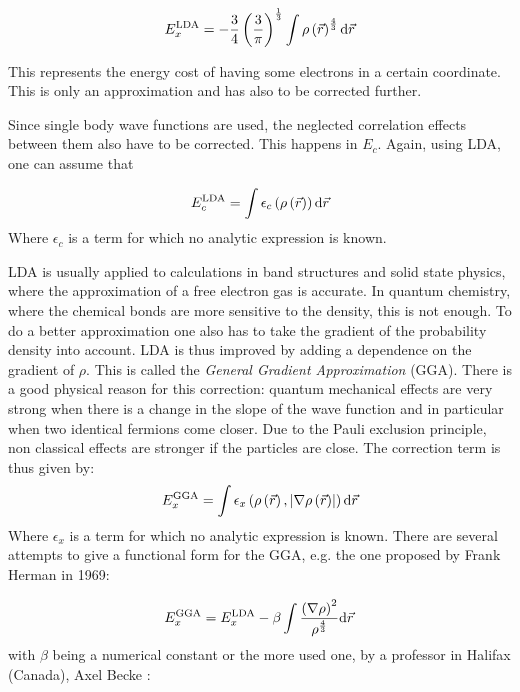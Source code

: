 \begin{equation}
E_x^{\text{LDA}} = 
-\frac{3}{4} \left(\frac{3}{\pi}\right)^{\frac{1}{3}} \int {\rho\ensuremath{\left(\vec{r}\right)}^{\frac{4}{3}} \text{d}\vec{r}  }
\end{equation}

\noindent
This represents the energy cost of having some electrons in a certain coordinate. This is only an approximation and has also to be corrected further.

Since single body wave functions are used, the neglected correlation effects between them also have to be corrected. This happens in $E_c$. Again, using LDA, one can assume that

\begin{equation}
E_c^{\text{LDA}} = 
 \int {\epsilon_c \ensuremath{\left(\rho\left(\vec{r}\right)\right)} \text{d}\vec{r}  }
\end{equation}
Where $\epsilon_c$ is a term for which no analytic expression is known.


LDA is usually applied to calculations in band structures and solid state physics, where the approximation of a free electron gas is accurate. In quantum chemistry, where the chemical bonds are more sensitive to the density, this is not enough. To do a better approximation one also has to take  the gradient of the probability density into account. LDA is thus improved by adding a dependence on the gradient of $\rho$. This is called the \emph{General Gradient Approximation} (GGA).  There is a good physical reason for this correction: quantum mechanical effects are very strong when there is a change in the slope of the wave function and in particular when two identical fermions come closer. Due to the Pauli exclusion principle, non classical effects are stronger if the particles are close. The correction term is thus given by:
\begin{equation}
E_x^{\text{GGA}} = 
 \int {\epsilon_x \ensuremath{\left(   \rho\left(\vec{r}\right), \left|\nabla  \rho\left(\vec{r}\right) \right|   \right)} \text{d}\vec{r}  }
\end{equation}
Where $\epsilon_x$ is a term for which no analytic expression is known. There are several attempts to give a functional form for the GGA, e.g. the one proposed by Frank Herman in 1969:

\begin{equation}
E_x^{\text{GGA}} =  E_x^{\text{LDA}} -
 \beta \int { \frac{\ensuremath{\left(\nabla \rho\right)}^2}{\rho^{\frac{4}{3}}}  \text{d}\vec{r}  }
\end{equation}
with $\beta$ being a numerical constant or the more used one, by a professor in Halifax (Canada), Axel Becke \citep{becke}:
 

